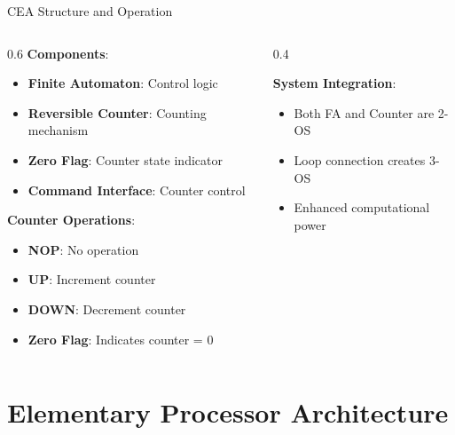 \documentclass[aspectratio=169,11pt]{beamer}
\newcommand{\concept}[1]{\textbf{\color{accentcolor}#1}}
\begin{document}
\begin{frame}{CEA Structure and Operation}
\begin{columns}
\begin{column}{0.6\textwidth}
\concept{Components}:
\begin{itemize}
\item \textbf{Finite Automaton}: Control logic
\item \textbf{Reversible Counter}: Counting mechanism
\item \textbf{Zero Flag}: Counter state indicator
\item \textbf{Command Interface}: Counter control
\end{itemize}

\vspace{0.3cm}
\concept{Counter Operations}:
\begin{itemize}
\item \textbf{NOP}: No operation
\item \textbf{UP}: Increment counter
\item \textbf{DOWN}: Decrement counter
\item \textbf{Zero Flag}: Indicates counter = 0
\end{itemize}
\end{column}
\begin{column}{0.4\textwidth}
\begin{center}

\end{center}
\concept{System Integration}:
\begin{itemize}
\item Both FA and Counter are 2-OS
\item Loop connection creates 3-OS
\item Enhanced computational power
\end{itemize}
\end{column}
\end{columns}
\end{frame}

\section{Elementary Processor Architecture}
\end{document}
